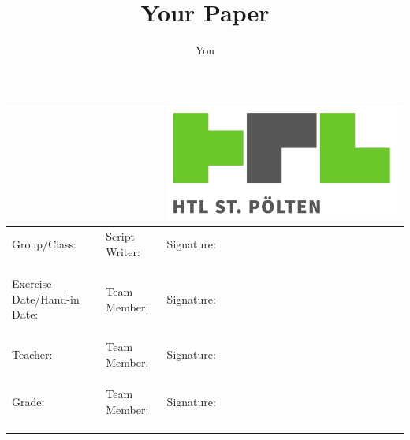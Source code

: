 \documentclass{article}
\title{Your Paper}
\author{You}
\begin{document}
\begin{center}
    \begin{tabularx}{\textwidth}{ |X|X|X| } \hline
         &  
            \begin{minipage}{.3\textwidth}
                \includegraphics[width=\linewidth]{htl_logo.jpg}
            \end{minipage} \\ \hline 

        Group/Class: & Script Writer: & Signature:              \\ && \\     &  & \\ && \\ \hline
        Exercise Date/Hand-in Date: & Team Member: & Signature: \\ && \\       &  & \\ && \\ \hline
        Teacher: & Team Member: & Signature:                    \\ && \\       &  & \\ && \\ \hline
        Grade: & Team Member: & Signature:                      \\ && \\                                &  & \\ && \\ \hline


\end{tabularx}
\end{center}
\end{document}
